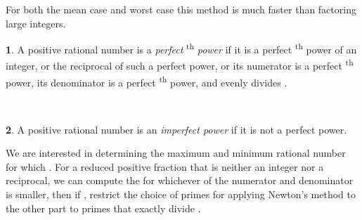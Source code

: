 \documentclass[12pt,english]{article}
\theoremstyle{definition}
\newtheorem*{defn*}{\protect\definitionname}
\theoremstyle{remark}
\theoremstyle{plain}
\theoremstyle{plain}
\providecommand{\definitionname}{Definition}
\begin{document}
For both the mean case and worst case this method is much faster than
factoring large integers.
\begin{defn*}
A positive rational number is a \textsl{perfect} \textsuperscript{th}
\textsl{power} if it is a perfect \textsuperscript{th} power
of an integer, or the reciprocal of such a perfect power, or its numerator
is a perfect \textsuperscript{th} power, its denominator is a
perfect \textsuperscript{th} power, and  evenly divides
.\emph{\vspace{-0.8em}
}
\end{defn*}
\,
\begin{defn*}
A positive rational number is an \textsl{imperfect power} if it is
not a perfect power.
\end{defn*}
We are interested in determining the maximum  and minimum
rational number  for which .
For a reduced positive fraction  that is neither an integer nor
a reciprocal, we can compute the  for whichever of the
numerator and denominator is smaller, then if , restrict
the choice of primes for applying Newton's method to the other part
to primes that exactly divide .
\end{document}
